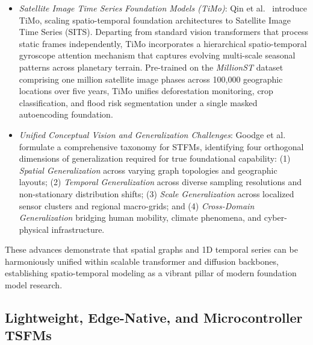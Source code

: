 \begin{itemize}[leftmargin=*]
    \item \emph{Satellite Image Time Series Foundation Models (TiMo)}: Qin et al.~\cite{qin2025timo} introduce TiMo, scaling spatio-temporal foundation architectures to Satellite Image Time Series (SITS). Departing from standard vision transformers that process static frames independently, TiMo incorporates a hierarchical spatio-temporal gyroscope attention mechanism that captures evolving multi-scale seasonal patterns across planetary terrain. Pre-trained on the \emph{MillionST} dataset comprising one million satellite image phases across 100,000 geographic locations over five years, TiMo unifies deforestation monitoring, crop classification, and flood risk segmentation under a single masked autoencoding foundation.
    \item \emph{Unified Conceptual Vision and Generalization Challenges}: Goodge et al.~\cite{goodge2025stfmvision} formulate a comprehensive taxonomy for STFMs, identifying four orthogonal dimensions of generalization required for true foundational capability: (1) \emph{Spatial Generalization} across varying graph topologies and geographic layouts; (2) \emph{Temporal Generalization} across diverse sampling resolutions and non-stationary distribution shifts; (3) \emph{Scale Generalization} across localized sensor clusters and regional macro-grids; and (4) \emph{Cross-Domain Generalization} bridging human mobility, climate phenomena, and cyber-physical infrastructure.
\end{itemize}
These advances demonstrate that spatial graphs and 1D temporal series can be harmoniously unified within scalable transformer and diffusion backbones, establishing spatio-temporal modeling as a vibrant pillar of modern foundation model research.

\subsection{Lightweight, Edge-Native, and Microcontroller TSFMs}
\label{sec:edge_native_tsfm}

